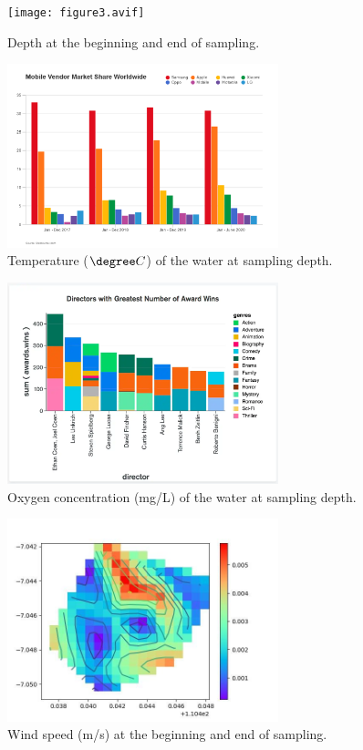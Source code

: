\begin{figure}[]
    \centering
    \texttt{[image: figure3.avif]}
    \caption{Depth at the beginning and end of sampling. \label{fig:fig1c}}
\end{figure}

\begin{figure}[]
    \centering
    \includegraphics[width=0.7\textwidth]{figure4.png}
    \caption{Temperature (\( \degree C \)) of the water at sampling depth. \label{fig:fig1d}}
\end{figure}

\begin{figure}[]
    \centering
    \includegraphics[width=0.7\textwidth]{figure5.webp}
    \caption{Oxygen concentration (mg/L) of the water at sampling depth. \label{fig:fig1e}}
\end{figure}

\begin{figure}[]
    \centering
    \includegraphics[width=0.7\textwidth]{figure6.png}
    \caption{Wind speed (m/s) at the beginning and end of sampling. \label{fig:fig1f}}
\end{figure}

